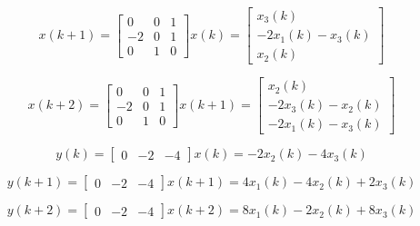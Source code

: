 \documentclass[12pt,a4paper, margin=1in]{article}
\begin{document}
\begin{enumerate}[label=\textbf{\arabic*.}]
\begin{enumerate}
                \begin{equation*}
                    x(k+1) = \begin{bmatrix}
                        0 & 0 & 1 \\
                        -2 & 0 & 1 \\
                        0 & 1 & 0
                    \end{bmatrix} x(k) = \begin{bmatrix}
                        x_3(k) \\ -2x_1(k) - x_3(k) \\ x_2(k)
                    \end{bmatrix}
                \end{equation*}

                \begin{equation*}
                    x(k+2) = \begin{bmatrix}
                        0 & 0 & 1 \\
                        -2 & 0 & 1 \\
                        0 & 1 & 0
                    \end{bmatrix} x(k+1) = \begin{bmatrix}
                        x_2(k) \\ -2x_3(k) - x_2(k) \\ -2x_1(k) - x_3(k)
                    \end{bmatrix}
                \end{equation*}

                \begin{equation*}
                    y(k) = \begin{bmatrix}
                        0 & -2 & -4
                    \end{bmatrix} x(k) = -2x_2(k) - 4x_3(k)
                \end{equation*}

                \begin{equation*}
                    y(k+1) = \begin{bmatrix}
                        0 & -2 & -4
                    \end{bmatrix} x(k+1) = 4x_1(k) - 4x_2(k) + 2x_3(k)
                \end{equation*}

                \begin{equation*}
                    y(k+2) = \begin{bmatrix}
                        0 & -2 & -4
                    \end{bmatrix} x(k+2) = 8x_1(k) - 2x_2(k) + 8x_3(k)
                \end{equation*}


\end{enumerate}
\end{enumerate}
\end{document}
